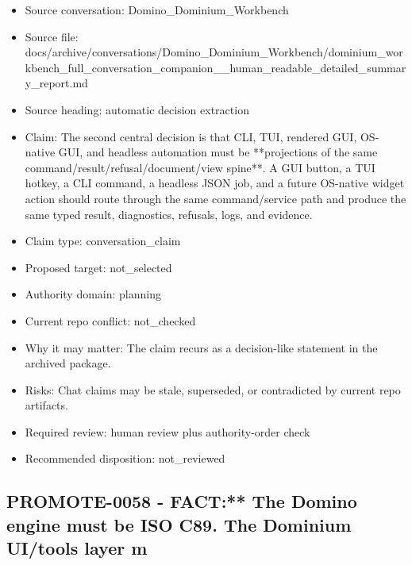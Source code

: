 \documentclass[11pt,a4paper]{report}
\begin{document}
\begin{itemize}
\item Source conversation: Domino\_Dominium\_Workbench
\item Source file: docs/archive/conversations/Domino\_Dominium\_Workbench/dominium\_workbench\_full\_conversation\_companion\_\_human\_readable\_detailed\_summary\_report.md
\item Source heading: automatic decision extraction
\item Claim: The second central decision is that CLI, TUI, rendered GUI, OS-native GUI, and headless automation must be **projections of the same command/result/refusal/document/view spine**. A GUI button, a TUI hotkey, a CLI command, a headless JSON job, and a future OS-native widget action should route through the same command/service path and produce the same typed result, diagnostics, refusals, logs, and evidence.
\item Claim type: conversation\_claim
\item Proposed target: not\_selected
\item Authority domain: planning
\item Current repo conflict: not\_checked
\item Why it may matter: The claim recurs as a decision-like statement in the archived package.
\item Risks: Chat claims may be stale, superseded, or contradicted by current repo artifacts.
\item Required review: human review plus authority-order check
\item Recommended disposition: not\_reviewed
\end{itemize}

\subsection{PROMOTE-0058 - FACT:** The Domino engine must be ISO C89. The Dominium UI/tools layer m}
\end{document}
